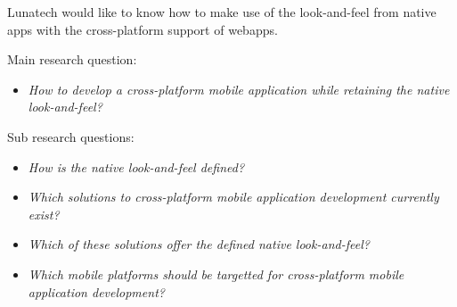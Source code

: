 Lunatech would like to know how to make use of the look-and-feel from native apps with the cross-platform support of webapps.


Main research question:
\begin{itemize}
\item \emph{How to develop a cross-platform mobile application while retaining the native look-and-feel?}
\end{itemize}

\noindent Sub research questions:
\begin{itemize}
\item \emph{How is the native look-and-feel defined?}
\item \emph{Which solutions to cross-platform mobile application development currently exist?}
\item \emph{Which of these solutions offer the defined native look-and-feel?}
\item \emph{Which mobile platforms should be targetted for cross-platform mobile application development?}
\end{itemize}